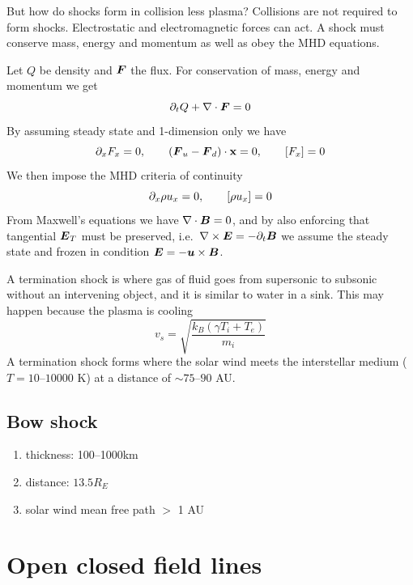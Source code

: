 But how do shocks form in collision less plasma? Collisions are not required to form shocks. Electrostatic and electromagnetic forces can act. A shock must conserve mass, energy and momentum as well as obey the MHD equations.

Let \(Q\) be density and \(\boldsymbol{F}\) the flux. For conservation of mass, energy and momentum we get
\begin{equation*}
    \partial_{t}Q+\nabla\cdot\boldsymbol{F}=0
\end{equation*}
By assuming steady state and 1-dimension only we have
\begin{equation*}
    \partial_{x}F_x=0,\qquad\left(\boldsymbol{F}_{u}-\boldsymbol{F}_{d}\right)\cdot\mathbf{x}=0,\qquad\left[F_x\right]=0
\end{equation*}
We then impose the MHD criteria of continuity
\begin{equation*}
    \partial_{x}\rho u_x=0,\qquad\left[\rho u_x\right]=0
\end{equation*}
From Maxwell's equations we have \(\nabla\cdot\boldsymbol{B}=0\), and by also enforcing that tangential \(\boldsymbol{E}_T\) must be preserved, i.e.~\(\nabla\times\boldsymbol{E}=-\partial_{t}\boldsymbol{B}\) we assume the steady state and frozen in condition \(\boldsymbol{E}=-\boldsymbol{u}\times\boldsymbol{B}\).

A termination shock is where gas of fluid goes from supersonic to subsonic without an intervening object, and it is similar to water in a sink. This may happen because the plasma is cooling
\begin{equation*}
    v_s=\sqrt{\frac{k_B\left(\gamma T_i+T_e\right)}{m_i}}
\end{equation*}
A termination shock forms where the solar wind meets the interstellar medium (\(T=10\)--\(\num{10000}\) K) at a distance of \(\sim 75\)--\(90\) AU\@.

\subsection{Bow shock}
\begin{enumerate}[\(\bullet \)]
    \item thickness: 100--1000\si{\kilo\metre}
    \item distance: \(13.5R_E\)
    \item solar wind mean free path \(>\) 1 AU
\end{enumerate}

\section{Open closed field lines}
